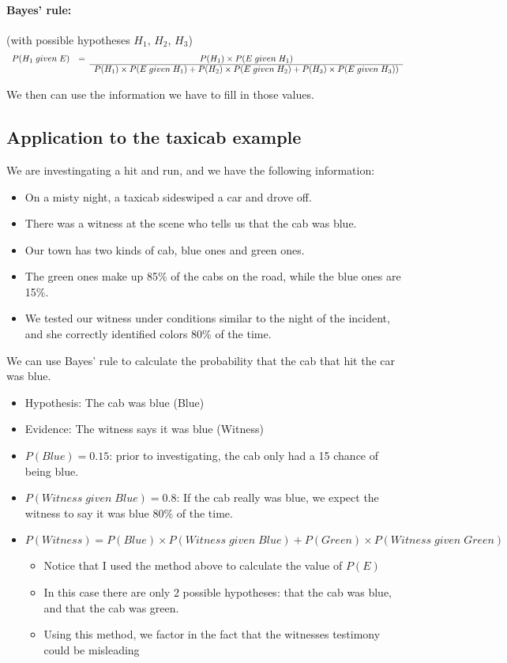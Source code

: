 \documentclass[letterpaper,10pt]{article}
\begin{document}
\paragraph{Bayes' rule:} (with possible hypotheses $H_1$, $H_2$, $H_3$)
\[\begin{array}{ccc}
P(H_1\; given\; E) & = & P(H_1) \times P(E\; given\; H_1) \\ \cline{3-3}
 & & P(H_1)\times P(E\;given\; H_1)+ P(H_2)\times P(E\;given\; H_2)+ P(H_3)\times P(E\;given\; H_3)) \\
  \end{array}\]

We then can use the information we have to fill in those values.

\subsection{Application to the taxicab example}

We are investingating a hit and run, and we have the following information:
\begin{itemize}
 \item On a misty night, a taxicab sideswiped a car and drove off.
 \item There was a witness at the scene who tells us that the cab was blue.
 \item Our town has two kinds of cab, blue ones and green ones.
 \item The green ones make up 85\% of the cabs on the road, while the blue ones are 15\%.
 \item We tested our witness under conditions similar to the night of the incident, and she correctly identified colors 80\% of the time.
\end{itemize}

We can use Bayes' rule to calculate the probability that the cab that hit the car was blue.
\begin{itemize}
 \item Hypothesis: The cab was blue (Blue)
 \item Evidence: The witness says it was blue (Witness)
 \item $P(Blue)=0.15$: prior to investigating, the cab only had a 15 chance of being blue.
 \item $P(Witness\;given\;Blue)=0.8$: If the cab really was blue, we expect the witness to say it was blue 80\% of the time.
 \item $P(Witness)=P(Blue)\times P(Witness\; given\; Blue)+ P(Green)\times P(Witness\; given\; Green)$
 	\begin{itemize}
 		\item Notice that I used the method above to calculate the value of $P(E)$
 		\item In this case there are only 2 possible hypotheses: that the cab was blue, and that the cab was green.
 		\item Using this method, we factor in the fact that the witnesses testimony could be misleading
 	\end{itemize}
\end{itemize}
\end{document}

